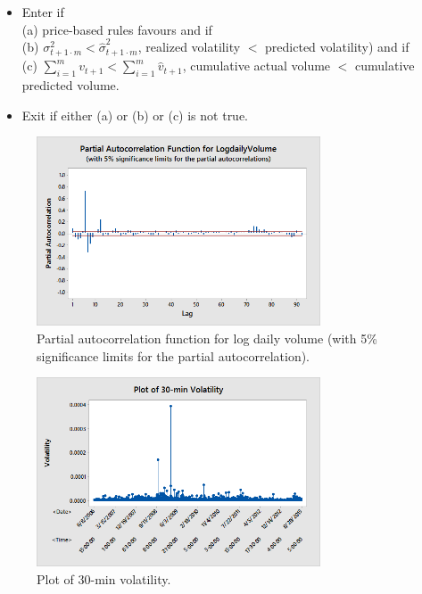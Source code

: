 	\begin{itemize}
	\item Enter if \\
	(a) price-based rules favours and if \\
	(b) $\sigma_{t+1\cdot m}^2< \hat{\sigma}_{t+1\cdot m}^2$, realized volatility $<$ predicted volatility) and if \\
	(c) $\sum_{i=1}^m v_{t+1} < \sum_{i=1}^m \hat{v}_{t+1}$, cumulative actual volume $<$ cumulative predicted volume. 
	\item Exit if either (a) or (b) or (c) is not true. 
	\end{itemize}
	
        \begin{figure}[H]
        \centering
        \includegraphics[width=0.75\textwidth]{chapters/chapter_stat_ts/figures/logdaily.png}
        \caption{Partial autocorrelation function for log daily volume (with 5\% significance limits for the partial autocorrelation). \label{fig:logdailyvolume}}
        \end{figure}
        
        \begin{figure}[H]
        \centering
        \includegraphics[width=0.75\textwidth]{chapters/chapter_stat_ts/figures/30min.png}
        \caption{Plot of 30-min volatility. \label{fig:30min}}
        \end{figure}
        
